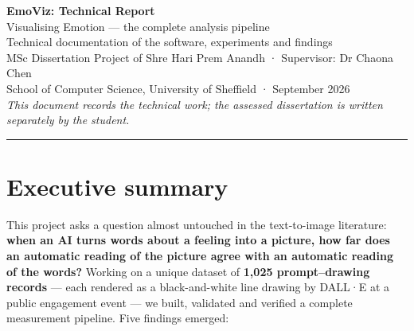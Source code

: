 \documentclass[11pt,a4paper]{article}
\begin{document}
\begin{center}
{\huge\bfseries EmoViz: Technical Report}\\[6pt]
{\Large Visualising Emotion --- the complete analysis pipeline}\\[10pt]
{\color{soft} Technical documentation of the software, experiments and findings}\\[4pt]
{\color{soft} MSc Dissertation Project of Shre Hari Prem Anandh · Supervisor: Dr Chaona Chen}\\
{\color{soft} School of Computer Science, University of Sheffield · September 2026}\\[6pt]
{\small\color{soft}\emph{This document records the technical work; the assessed dissertation is written separately by the student.}}
\end{center}

\vspace{4pt}
\hrule
\vspace{10pt}

\section*{Executive summary}
This project asks a question almost untouched in the text-to-image literature: \textbf{when an AI
turns words about a feeling into a picture, how far does an automatic reading of the picture agree
with an automatic reading of the words?} Working on a unique dataset of \textbf{1{,}025
prompt--drawing records} --- each rendered as a black-and-white line drawing by DALL·E at a public
engagement event --- we built, validated and verified a complete measurement pipeline. Five findings
emerged:
\end{document}

